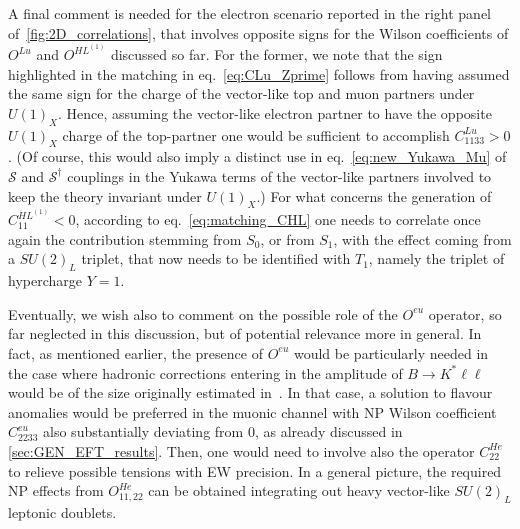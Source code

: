 A final comment is needed for the electron scenario reported in the right panel of~\autoref{fig:2D_correlations}, that involves opposite signs for the Wilson coefficients of $O^{Lu}$ and $O^{HL^{(1)}}$ discussed so far. For the former, we note that the sign highlighted in the matching in eq.~\eqref{eq:CLu_Zprime} follows from having assumed the same sign for the charge of the vector-like top and muon partners under $U(1)_{X}$.
Hence, assuming the vector-like electron partner to have the opposite  $U(1)_{X}$ charge of the top-partner one would be sufficient to  accomplish $C^{Lu}_{1133} > 0$. (Of course, this would also imply a distinct use in eq.~\eqref{eq:new_Yukawa_Mu} of $\mathcal{S}$ and $\mathcal{S}^{\dagger}$ couplings in the Yukawa terms of the vector-like partners involved to keep the theory invariant under $U(1)_{X}$.) For what concerns the generation of $C^{HL^{(1)}}_{11} < 0 $, according to eq.~\eqref{eq:matching_CHL} one needs to correlate once again the contribution stemming from $S_{0}$, or from $S_{1}$, with the effect coming from a $SU(2)_{L}$ triplet, that now needs to be identified with $T_{1}$, namely the triplet of hypercharge $Y=1$.

Eventually, we wish also to comment on the possible role of the $O^{eu}$ operator, so far neglected in this discussion, but of potential relevance more in general. In fact, as mentioned earlier, the presence of $O^{eu}$ would be particularly needed in the case where hadronic corrections entering in the amplitude of $B \to K^* \ell \ell $ would be of the size originally estimated in~\cite{Khodjamirian:2010vf}. 
In that case, a solution to flavour anomalies would be preferred in the muonic channel with NP Wilson coefficient $C^{eu}_{2233}$ also substantially deviating from 0, as already discussed in \autoref{sec:GEN_EFT_results}. Then, one would need to involve also the operator $C^{He}_{22}$ to relieve possible tensions with EW precision. In a general picture, the required NP effects from $O^{He}_{11,22}$ can be obtained integrating out heavy vector-like $SU(2)_{L}$ leptonic doublets.


